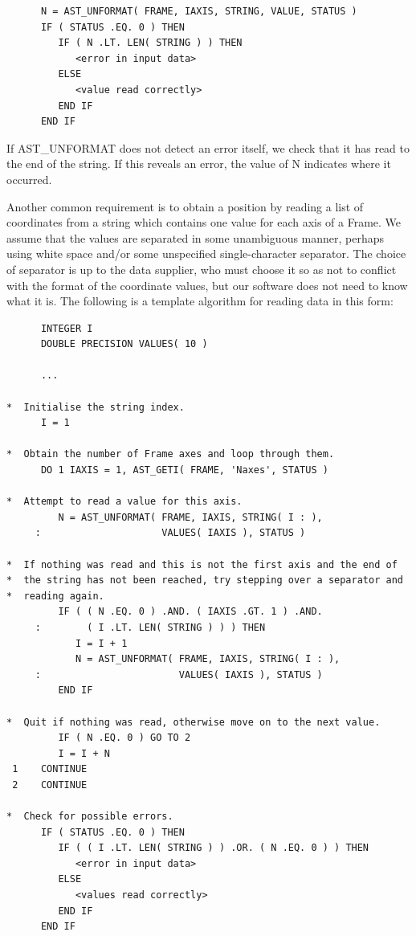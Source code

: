 \documentclass[twoside,11pt]{article}
\begin{document}
\small
\begin{verbatim}
      N = AST_UNFORMAT( FRAME, IAXIS, STRING, VALUE, STATUS )
      IF ( STATUS .EQ. 0 ) THEN
         IF ( N .LT. LEN( STRING ) ) THEN
            <error in input data>
         ELSE
            <value read correctly>
         END IF
      END IF
\end{verbatim}
\normalsize

If AST\_UNFORMAT does not detect an error itself, we check that it has
read to the end of the string. If this reveals an error, the value of
N indicates where it occurred.

Another common requirement is to obtain a position by reading a list
of coordinates from a string which contains one value for each axis of
a Frame. We assume that the values are separated in some unambiguous
manner, perhaps using white space and/or some unspecified
single-character separator. The choice of separator is up to the data
supplier, who must choose it so as not to conflict with the format of
the coordinate values, but our software does not need to know what it
is. The following is a template algorithm for reading data in this
form:

\small
\begin{verbatim}
      INTEGER I
      DOUBLE PRECISION VALUES( 10 )

      ...

*  Initialise the string index.
      I = 1

*  Obtain the number of Frame axes and loop through them.
      DO 1 IAXIS = 1, AST_GETI( FRAME, 'Naxes', STATUS )

*  Attempt to read a value for this axis.
         N = AST_UNFORMAT( FRAME, IAXIS, STRING( I : ),
     :                     VALUES( IAXIS ), STATUS )

*  If nothing was read and this is not the first axis and the end of
*  the string has not been reached, try stepping over a separator and
*  reading again.
         IF ( ( N .EQ. 0 ) .AND. ( IAXIS .GT. 1 ) .AND.
     :        ( I .LT. LEN( STRING ) ) ) THEN
            I = I + 1
            N = AST_UNFORMAT( FRAME, IAXIS, STRING( I : ),
     :                        VALUES( IAXIS ), STATUS )
         END IF

*  Quit if nothing was read, otherwise move on to the next value.
         IF ( N .EQ. 0 ) GO TO 2
         I = I + N
 1    CONTINUE
 2    CONTINUE

*  Check for possible errors.
      IF ( STATUS .EQ. 0 ) THEN
         IF ( ( I .LT. LEN( STRING ) ) .OR. ( N .EQ. 0 ) ) THEN
            <error in input data>
         ELSE
            <values read correctly>
         END IF
      END IF
\end{verbatim}
\normalsize
\end{document}

